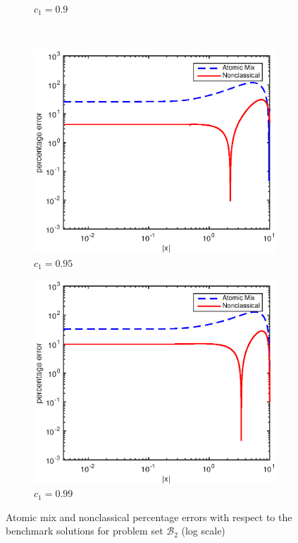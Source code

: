 \documentclass[12pt]{article}
\newcommand{\setb}{\mathcal{B}}
\begin{document}
{\begin{figure}[p]
\begin{subfigure}{0.495\textwidth}
        \caption{$c_1 = 0.9$}
        \label{figerrE90}
    \end{subfigure}
    \\
    \centering
    \begin{subfigure}{0.495\textwidth}
        \centering
        \includegraphics[width=\textwidth]{NSE_err_E95.eps}
        \caption{$c_1 = 0.95$}
        \label{figerrE95}
    \end{subfigure}
    \hfill
    \begin{subfigure}{0.495\textwidth}
        \centering
        \includegraphics[width=\textwidth]{NSE_err_E99.eps}
        \caption{$c_1 = 0.99$}
        \label{figerrE99}
    \end{subfigure}
    \caption{Atomic mix and nonclassical percentage errors with respect to the benchmark solutions for problem set $\setb_2$ (log scale)}
    \label{figerrE2}
\end{figure}





}
\end{document}
